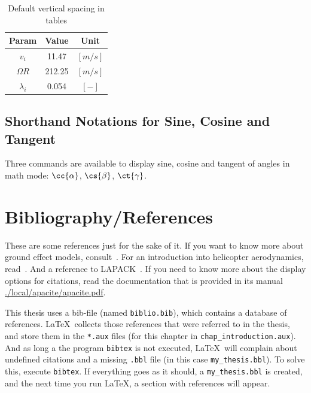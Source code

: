             \begin{table}[!htb]
                \centering
                \begin{tabular}{ c c c }
                    \hline
                    Param                       & Value   & Unit    \\
                    \hline
                    $v_i$                       & 11.47   & $[m/s]$ \\
                    $\Omega R$                  & 212.25  & $[m/s]$ \\
                    $\lambda_i$                 & 0.054   & $[-]$   \\
                    \hline
                \end{tabular}
                \caption{Default vertical spacing in tables}\label{tab:sample_table2}
            \end{table}
        \subsection{Shorthand Notations for Sine, Cosine and Tangent}
            Three commands are available to display sine, cosine and tangent of angles in math mode: $\cc{\alpha}$, $\cs{\beta}$, $\ct{\gamma}$.
    \section{Bibliography/References}%
        These are some references just for the sake of it. If you want to know more about ground effect models, consult~\cite{xin_phd}.
        For an introduction into helicopter aerodynamics, read~\cite{leishman_book}. And a reference to LAPACK~\cite{lug}.
        If you need to know more about the display options for citations, read the documentation that is provided in its manual \url{./local/apacite/apacite.pdf}.
        
        This thesis uses a bib-file (named \verb+biblio.bib+), which contains a database of references. \LaTeX~collects those references that were referred to in the thesis, and store them in the \verb+*.aux+ files (for this chapter in \verb+chap_introduction.aux+). And as long a the program \verb+bibtex+ is not executed, \LaTeX~will complain about undefined citations and a missing \verb+.bbl+ file (in this case \verb+my_thesis.bbl+). To solve this, execute \verb+bibtex+. If everything goes as it should, a \verb+my_thesis.bbl+ is created, and the next time you run \LaTeX, a section with references will appear.
        
